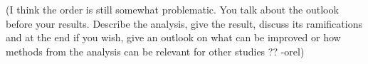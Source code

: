 {\color{red}(I think the order is still somewhat problematic.
You talk about the outlook before your results.
Describe the analysis, give the result, discuss its ramifications and at the end if you wish, give an outlook on what can be improved or how methods from the analysis can be relevant for other studies ?? -orel)}

